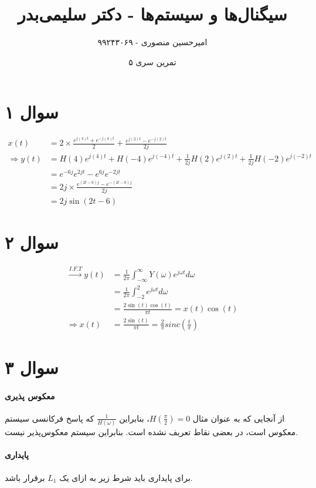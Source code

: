 \documentclass{article}
\title{سیگنال‌ها و سیستم‌ها - دکتر سلیمی‌بدر}
\author{امیرحسین منصوری - ۹۹۲۴۳۰۶۹}
\date{تمرین سری ۵}
\begin{document}
	\maketitle

	\section*{سوال ۱}

	\begin{align*}
		x(t) &= 2 \times \frac{e^{j(4)t} + e^{-j(4)t}}{2}
		+ \frac{e^{j(2)t} - e^{-j(2)t}}{2j} \\
		\Rightarrow
		y(t) &= H(4)e^{j(4)t} + H(-4)e^{j(-4)t} + \frac{1}{2j}H(2)e^{j(2)t} + \frac{1}{2j}H(-2)e^{j(-2)t} \\
		&= e^{-6j}e^{2jt} - e^{6j}e^{-2jt} \\
		&= 2j \times \frac{e^{(2t-6)j} - e^{-(2t-6)j}}{2j} \\
		&= 2j \sin(2t-6)
	\end{align*}

	\section*{سوال ۲}

	\begin{align*}
		\xrightarrow{I.F.T} y(t) &= \frac{1}{2\pi} \int_{-\infty}^{\infty}
		Y(\omega) e^{j\omega t} d\omega \\
		&= \frac{1}{2\pi} \int_{-2}^{2} e^{j\omega t} d\omega \\
		&= \frac{2\sin(t)\cos(t)}{\pi t}
		= x(t)\cos(t) \\
		\Rightarrow
		x(t) &= \frac{2\sin(t)}{\pi t} = \frac{2}{\pi} sinc(\frac{t}{\pi})
	\end{align*}

	\section*{سوال ۳}
	\paragraph*{معکوس پذیری}
	از آنجایی که به عنوان مثال
	$H(\frac{\pi}{2}) = 0$،
	بنابراین
	$\frac{1}{H(\omega)}$
	که پاسخ فرکانسی سیستم معکوس است، در بعضی نقاط تعریف نشده است. بنابراین سیستم معکوس‌پذیر نیست.

	\paragraph*{پایداری}
	برای پایداری باید شرط زیر به ازای یک
	$L_1$
	برقرار باشد.
\end{document}
